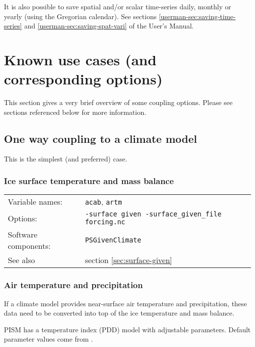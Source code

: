 \documentclass[titlepage,letterpaper,final]{scrartcl}
\begin{document}
It is also possible to save spatial and/or scalar time-series daily, monthly or
yearly (using the Gregorian calendar). See sections \ref*{userman-sec:saving-time-series}
and \ref*{userman-sec:saving-spat-vari} of the User's Manual.

\section{Known use cases (and corresponding options)}
\label{sec:known-use-cases}

This section gives a very brief overview of some coupling options. Please see sections referenced below for more information.

\subsection{One way coupling to a climate model}
\label{sec:one-way-coupling}

This is the simplest (and preferred) case.

\subsubsection{Ice surface temperature and mass balance}
\label{sec:ice-surface-bc}
\begin{center}
  \begin{tabular}{lp{}}
    \toprule
    Variable names: & \texttt{acab}, \texttt{artm} \\
    Options: & \texttt{-surface given -surface_given_file forcing.nc} \\
    Software components: & \texttt{PSGivenClimate} \\
    See also & section \ref{sec:surface-given} \\
    \bottomrule
  \end{tabular}
\end{center}

\subsubsection{Air temperature and precipitation}
\label{sec:air-temp-and-precip}

If  a climate model  provides near-surface  air temperature  and precipitation,
these  data need  to be  converted into  top of  the ice  temperature  and mass
balance.

PISM has  a temperature index  (PDD) model with adjustable  parameters. Default
parameter values come from \cite{RitzEISMINT}.
\end{document}

